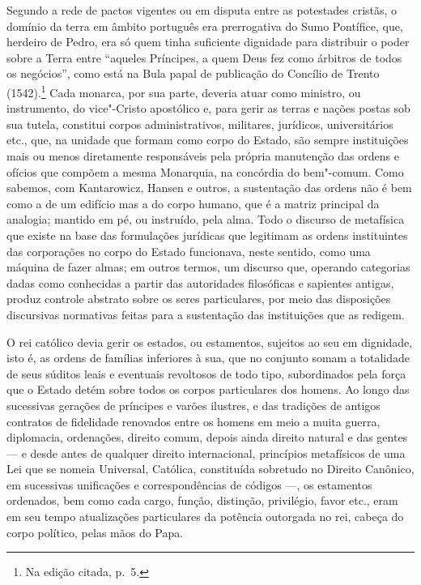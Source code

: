 Segundo a rede de pactos vigentes ou em disputa entre as potestades
cristãs, o domínio da terra em âmbito português era prerrogativa do
Sumo Pontífice, que, herdeiro de Pedro, era só quem tinha suficiente
dignidade para distribuir o poder sobre a Terra entre
``aqueles Príncipes, a quem Deus fez como árbitros de
todos os negócios'', como está na Bula papal de publicação
do Concílio de Trento (1542).\footnote{ Na edição citada, p.~5.} Cada
monarca, por sua parte, deveria atuar como ministro, ou instrumento, do
vice"-Cristo apostólico e, para gerir as terras e nações postas sob sua
tutela, constitui corpos administrativos, militares, jurídicos,
universitários etc., que, na unidade que formam como corpo do Estado,
são sempre instituições mais ou menos diretamente responsáveis pela
própria manutenção das ordens e ofícios que compõem a mesma Monarquia,
na concórdia do bem"-comum. Como sabemos, com Kantarowicz, Hansen e
outros, a sustentação das ordens não é bem como a de um edifício mas a
do corpo humano, que é a matriz principal da analogia; mantido em pé,
ou instruído, pela alma. Todo o discurso de metafísica que existe na
base das formulações jurídicas que legitimam as ordens instituintes das
corporações no corpo do Estado funcionava, neste sentido, como uma
máquina de fazer almas; em outros termos, um discurso que, operando
categorias dadas como conhecidas a partir das autoridades filosóficas e
sapientes antigas, produz controle abstrato sobre os seres
particulares, por meio das disposições discursivas normativas feitas
para a sustentação das instituições que as redigem.

O rei católico devia gerir os estados, ou estamentos, sujeitos ao seu em
dignidade, isto é, as ordens de famílias inferiores à sua, que no
conjunto somam a totalidade de seus súditos leais e eventuais
revoltosos de todo tipo, subordinados pela força que o Estado detém
sobre todos os corpos particulares dos homens. Ao longo das sucessivas
gerações de príncipes e varões ilustres, e das tradições de antigos
contratos de fidelidade renovados entre os homens em meio a muita
guerra, diplomacia, ordenações, direito comum, depois ainda direito
natural e das gentes --- e desde antes de qualquer direito internacional,
princípios metafísicos de uma Lei que se nomeia Universal, Católica,
constituída sobretudo no Direito Canônico, em sucessivas unificações e
correspondências de códigos ---, os estamentos ordenados, bem como cada
cargo, função, distinção, privilégio, favor etc., eram em seu tempo
atualizações particulares da potência outorgada no rei, cabeça do corpo
político, pelas mãos do Papa.

